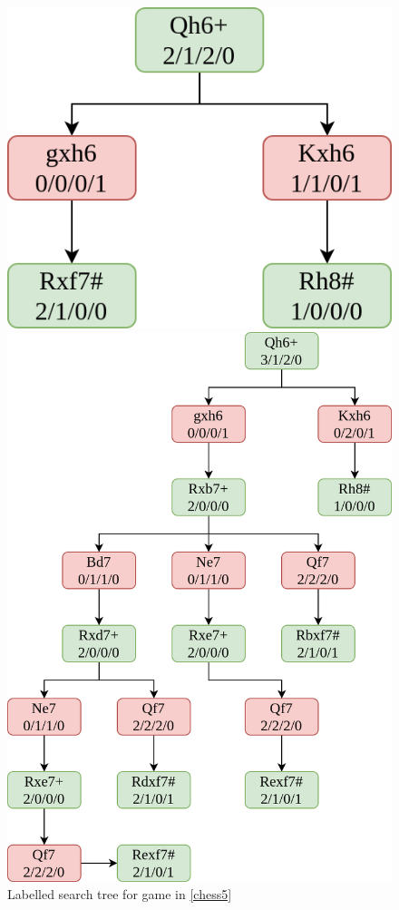 \begin{figure}[H]
  \begin{minipage}{0.475\textwidth}
    \centering
    \includegraphics[width=\textwidth]{project/img/trees/1.drawio.png}
    \caption{Labelled search tree for game in \ref{chess5}}
    \label{tree1}
  \end{minipage}
  \hspace{0.05\textwidth}
  \begin{minipage}{0.475\textwidth}
    \centering
    \includegraphics[width=\textwidth]{project/img/trees/2.drawio.png}

\end{minipage}
\end{figure}
